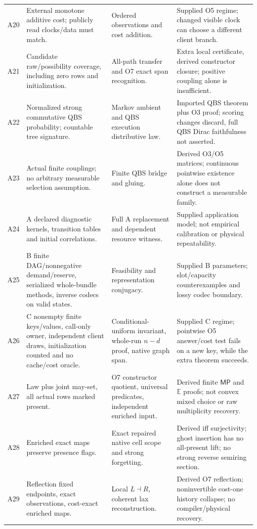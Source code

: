 \documentclass[11pt,a4paper]{article}
\theoremstyle{definition}
\newcommand{\MayProb}{\mathsf{MP}}
\begin{document}
\begin{longtable}{@{}p{.08\linewidth}p{.30\linewidth}p{.28\linewidth}p{.25\linewidth}@{}}
A20&External monotone additive cost; publicly read clocks/data must match.&
Ordered observations and cost addition.&Supplied O5 regime; changed visible
clock can choose a different client branch.\\
A21&Candidate raw/possibility coverage, including zero rows and initialization.&
All-path transfer and O7 exact span recognition.&Extra local certificate,
derived constructor closure; positive coupling alone is insufficient.\\
A22&Normalized strong commutative QBS probability; countable tree signature.&
Markov ambient and QBS execution distributive law.&Imported QBS theorem plus
O3 proof; scoring changes discard, full QBS Dirac faithfulness not asserted.\\
A23&Actual finite couplings; no arbitrary measurable selection assumption.&
Finite QBS bridge and gluing.&Derived O3/O5 matrices; continuous pointwise
existence alone does not construct a measurable family.\\
A24&A declared diagnostic kernels, transition tables and initial correlations.&
Full A replacement and dependent resource witness.&Supplied application model;
not empirical calibration or physical repeatability.\\
A25&B finite DAG/nonnegative demand/reserve, serialized whole-bundle methods,
inverse codecs on valid states.&Feasibility and representation conjugacy.&
Supplied B parameters; slot/capacity counterexamples and lossy codec boundary.\\
A26&C nonempty finite keys/values, call-only owner, independent client draws,
initialization counted and no cache/cost oracle.&Conditional-uniform invariant,
whole-run \(n-d\) proof, native graph span.&Supplied C regime; pointwise
O5 answer/cost test fails on a new key, while the extra theorem succeeds.\\
A27&Law plus joint may-set, all actual rows marked present.&O7 constructor
quotient, universal predicates, independent enriched input.&Derived finite
\(\MayProb\) and \(\mathbb E\) proofs; not convex mixed choice or
raw multiplicity recovery.\\
A28&Enriched exact maps preserve presence flags.&Exact repaired native cell
scope and strong forgetting.&Derived iff surjectivity; ghost insertion has no
all-present lift; no strong reverse semiring section.\\
A29&Reflection fixed endpoints, exact observations, cost-exact enriched maps.&
Local \(L\dashv R\), coherent lax reconstruction.&Derived O7 reflection;
noninvertible cost-one history collapse; no compiler/physical recovery.\\

\end{longtable}
\end{document}
